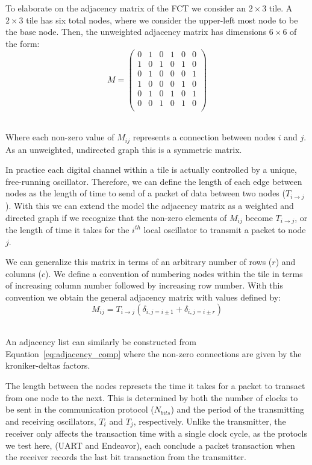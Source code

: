 To elaborate on the adjacency matrix of the FCT we consider an $2\times 3$ tile.
A $2\times 3$ tile has six total nodes, where we consider the upper-left most node to be the base node.
Then, the unweighted adjacency matrix has dimensions $6\times6$ of the form:
\begin{equation}
M =
 \begin{pmatrix}
 0 & 1 & 0 & 1 & 0 & 0 \\
 1 & 0 & 1 & 0 & 1 & 0 \\
 0 & 1 & 0 & 0 & 0 & 1 \\
 1 & 0 & 0 & 0 & 1 & 0 \\
 0 & 1 & 0 & 1 & 0 & 1 \\
 0 & 0 & 1 & 0 & 1 & 0 \\
 \end{pmatrix}
\end{equation}~\label{eq:adjacency_matr}


Where each non-zero value of $M_{ij}$ represents a connection between nodes $i$ and $j$.
As an unweighted, undirected graph this is a symmetric matrix.

In practice each digital channel within a tile is actually controlled by a unique, free-running oscillator.
Therefore, we can define the length of each edge between nodes as the length of time to send of a packet of data between two nodes ($T_{i\rightarrow j}$).
With this we can extend the model the adjacency matrix as a weighted and directed graph if we recognize that the non-zero elements of $M_{ij}$ become $T_{i\rightarrow j}$, or the length of time it takes for the $i^{th}$ local oscillator to transmit a packet to node $j$.

We can generalize this matrix in terms of an arbitrary number of rows ($r$) and columns ($c$).
We define a convention of numbering nodes within the tile in terms of increasing column number followed by increasing row number.
With this convention we obtain the general adjacency matrix with values defined by:
\begin{equation}
  M_{ij} = T_{i\rightarrow j}(\delta_{i,j=i\pm 1} + \delta_{i,j=i\pm r})
\end{equation}~\label{eq:adjacency_comp}

An adjacency list can similarly be constructed from Equation~\ref{eq:adjacency_comp} where the non-zero connections are given by the kroniker-deltas factors.

The length between the nodes represets the time it takes for a packet to transact from one node to the next.
This is determined by both the number of clocks to be sent in the communication protocol ($N_{bits}$) and the period of the transmitting and receiving oscillators, $T_{i}$ and $T_{j}$, respectively.
Unlike the transmitter, the receiver only affects the transaction time with a single clock cycle, as the protocls we test here, (UART and Endeavor), each conclude a packet transaction when the receiver records the last bit transaction from the transmitter.

